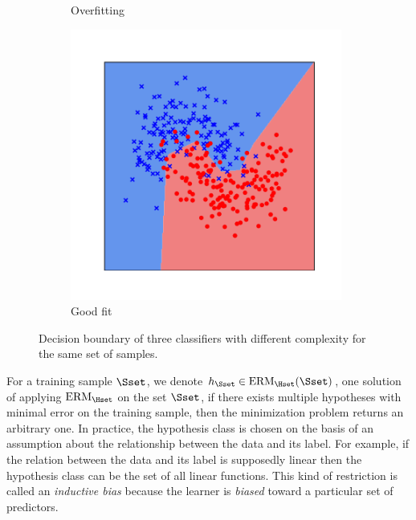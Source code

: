 \begin{figure}[t]
\begin{subfigure}[b]{0.32\textwidth}
    \caption{Overfitting}
    \label{figure:ch2-fitting_points_b}
  \end{subfigure}
  \hfill
  \begin{subfigure}[b]{0.32\textwidth}
    \includegraphics[width=0.98\textwidth]{figures/main/ch2-background/normal.pdf}
    \caption{Good fit}
    \label{figure:ch2-fitting_points_c}
  \end{subfigure}
  \caption{
    Decision boundary of three classifiers with different complexity for the same set of samples.
  }
  \label{figure:ch2-fitting_points}
\end{figure}


For a training sample $\Sset$, we denote $h_\Sset \in \mathrm{ERM}_{\Hset}(\Sset)$, one solution of applying $\mathrm{ERM}_\Hset$ on the set $\Sset$, if there exists multiple hypotheses with minimal error on the training sample, then the minimization problem returns an arbitrary one.
In practice, the hypothesis class is chosen on the basis of an assumption about the relationship between the data and its label.
For example, if the relation between the data and its label is supposedly linear then the hypothesis class can be the set of all linear functions.
This kind of restriction is called an \emph{inductive bias} because the learner is \emph{biased} toward a particular set of predictors.

